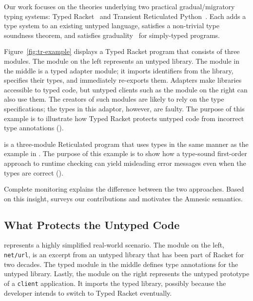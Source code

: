 \newcommand{\codett}[1]{{\small\tt #1}}

Our work focuses on the theories underlying two practical gradual/migratory
typing systems: Typed Racket~\cite{tf-popl-2008, tfffgksst-snapl-2017} and
Transient Reticulated Python~\cite{vss-popl-2017,v-thesis-2019}.
Each adds a type system to an existing untyped language, satisfies a
non-trivial type soundness theorem, and satisfies
graduality~\cite{svcb-snapl-2015,na-icfp-2018} for simply-typed programs.

Figure~\ref{fig:tr-example} displays a Typed Racket program that consists
of three modules.
The module on the left represents an untyped library.
The module in the middle is a typed adapter module; it imports identifiers from
the library, specifies their types, and immediately re-exports them.
Adapters make libraries accessible to typed code, but untyped clients such as
the module on the right can also use them.
The creators of such modules are likely to rely on the type specifications;
the types in this adaptor, however, are faulty.
The purpose of this example is to illustrate how Typed Racket protects untyped
code from incorrect type annotations ().

 is a three-module Reticulated program that
uses types in the same manner as the example in .
The purpose of this example is to show how a type-sound first-order approach to runtime
checking can yield misleading error messages even when the types are correct
().

Complete monitoring explains the difference between the two approaches.
Based on this insight, 
surveys our contributions and
 motivates the Amnesic semantics.

\subsection{What Protects the Untyped Code} \label{sec:protects}

 represents a highly simplified real-world
scenario. The module on the left, \codett{net/url}, is an excerpt from an
untyped library that has been part of Racket for two
decades.
The typed module in the middle defines type annotations for the untyped library.
Lastly, the module on the right represents the untyped prototype of a \codett{client}
application. It imports the typed library, possibly because the developer
intends to switch to Typed Racket eventually.

